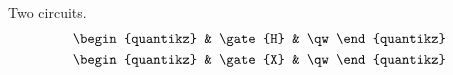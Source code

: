 \documentclass{article}
\begin{document}
Two circuits.
\begin{align*}
\begin{quantikz} & \gate{H} & \qw \end{quantikz} \\
\begin{quantikz} & \gate{X} & \qw \end{quantikz}
\end{align*}
\end{document}

